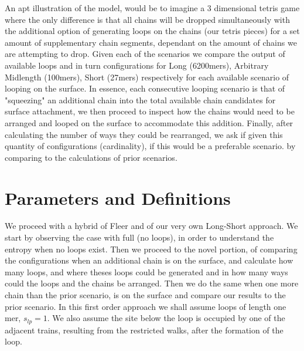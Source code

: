 \documentclass[10pt,letterpaper]{article}
\begin{document}
\noindent 




\noindent  An apt illustration of the model, would be to imagine a 3 dimensional tetris game where the only difference is that all chains will be dropped simultaneously with the additional option of generating loops on the chains (our tetris pieces) for a set amount of supplementary chain segments, dependant on the amount of chains we are attempting to drop. Given each of the scenarios we compare the output of available loops and in turn configurations for Long (6200mers), Arbitrary Midlength (100mers), Short (27mers) respectively for each available scenario of looping on the surface. In essence, each consecutive looping scenario is that of "squeezing" an additional chain into the total available chain candidates for surface attachment, we then proceed to inspect how the chains would need to be arranged and looped on the surface to accommodate this addition. Finally, after calculating the number of ways they could be rearranged, we ask if given this quantity of configurations (cardinality), if this would be a preferable scenario. by comparing to the calculations of prior scenarios.\\

\section*{Parameters and Definitions}
We proceed with a hybrid of Fleer \cite{fleer1993polymers} and of our very own Long-Short approach. We start by observing the case with full (no loops), in order to understand the entropy when no loops exist. Then we proceed to the novel portion, of comparing the configurations when an additional chain is on the surface, and calculate how many loops, and where theses loops could be generated and in how many ways could the loops and the chains be arranged. Then we do the same when one more chain than the prior scenario, is on the surface and compare our results to the prior scenario. In this first order approach we shall assume loops of length one mer, $s_{lp}=1$. We also assume the site below the loop is occupied by one of the adjacent trains, resulting from the restricted walks, after the formation of the loop.
\end{document}
